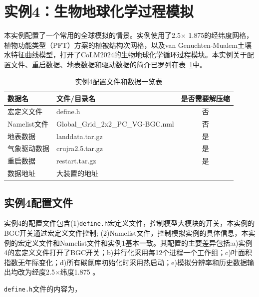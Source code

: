\section{实例4：生物地球化学过程模拟}

本实例配置了一个常用的全球模拟的情景。实例使用了2.5\textdegree $\times$ 1.875\textdegree 的经纬度网格，植物功能类型（PFT）方案的植被结构次网格，以及van Genuchten-Mualem土壤水特征曲线模型，打开了CoLM2024的生物地球化学循环过程模块。本实例关于配置文件、重启数据、地表数据和驱动数据的简介已罗列在表~\ref{ex4table}中。

\begin{table}[htbp]
\caption{实例4配置文件和数据一览表}
\centering \renewcommand{\arraystretch}{1.5}
\label{ex4table}
\begin{tabular}{llc}
\toprule
\textbf{数据名} & \textbf{文件/目录名} & \textbf{是否需要解压缩} \\

\midrule

宏定义文件 & define.h & 否 \\
Namelist文件 & Global\_Grid\_2x2\_PC\_VG-BGC.nml & 否 \\
地表数据 & landdata.tar.gz & 是 \\
气象驱动数据 & crujra2.5.tar.gz & 是 \\
重启数据 & restart.tar.gz & 是 \\

\midrule

数据地址 & \multicolumn{2}{l}{大装置的地址}\\

\bottomrule
\end{tabular}
\end{table}

\subsection{实例4配置文件}\label{ex4config}

实例4的配置文件包含(1)\texttt{define.h}宏定义文件，控制模型大模块的开关，本实例的BGC开关通过宏定义文件控制; (2)Namelist文件，控制模拟实例的具体信息，本实例的宏定义文件和Namelist文件和实例1基本一致。其配置的主要差异包括:a)实例4的宏定义文件打开了BGC开关；b)并行化采用每12个进程一个工作组；c)叶面积指数无年际变化；d)所有碳氮库初始化时采用热启动；e)模拟分辨率和历史数据输出均改为经度2.5$\times$纬度1.875 。

\texttt{define.h}文件的内容为，


